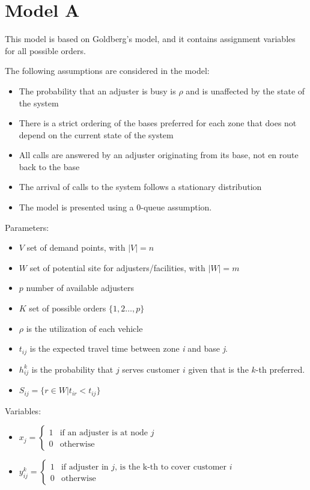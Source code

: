 
\section{Model A}

This model is based on Goldberg's model,
and it contains assignment variables
for all possible orders.

The following assumptions are considered in the model:
\begin{itemize}
\item The probability that an adjuster is busy 
  is $\rho$ and is unaffected by the state of the system
\item There is a strict ordering of the bases preferred for each zone
  that does not depend 
  on the current state of the system
\item All calls are answered by an adjuster originating from its base,
  not en route back to the base
\item The arrival of calls to the system
  follows a stationary distribution
\item The model is presented using a 0-queue assumption.
\end{itemize}

Parameters:
\begin{itemize}
\item $V$ set of demand points, 
  with $|V| = n$
\item $W$ set of potential site for adjusters/facilities,
  with $|W| = m$
\item $p$ number of available adjusters
\item $K$ set of possible orders $\{1,2\ldots,p\}$
\item $\rho$ is the utilization of each vehicle
\item $t_{ij}$ is the expected travel time
  between zone \textit{i}
  and base \textit{j}.
\item $h_{ij}^{k}$ is the probability
  that $j$ serves customer $i$
  given that
  is the $k$-th preferred.
\item $S_{ij} = \{
  r \in W | t_{ir} < t_{ij}
  \}$
\end{itemize}

Variables:
\begin{itemize}
\item $x_j =
  \begin{cases} 
    1 & \mbox{if an adjuster is at node } j \\
    0 & \mbox{otherwise}
  \end{cases}$
\item $y_{ij}^k =
  \begin{cases} 
    1 & \mbox{if adjuster in } j \mbox{, is the k-th to cover customer }i \\
    0 & \mbox{otherwise}
  \end{cases}$
\end{itemize}


